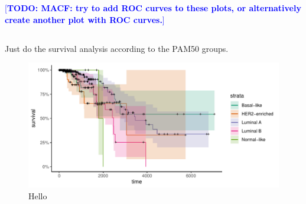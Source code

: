 \documentclass[10pt,twocolumn]{article}\usepackage[]{graphicx}\usepackage[]{color}
\makeatletter
\def\maxwidth{ %
  \ifdim\Gin@nat@width>\linewidth
    \linewidth
  \else
    \Gin@nat@width
  \fi
}
\newenvironment{knitrout}{}{} %
\newcommand{\todo}[1]{\textcolor{blue}{[\textbf{TODO: #1}]} }
\makeatother
\begin{document}
\todo{MACF: try to add ROC curves to these plots, or alternatively create another plot with ROC curves.}
\subsection{}
Just do the survival analysis according to the PAM50 groups.

\begin{knitrout}
\color{fgcolor}\begin{figure}[ht]

{\centering \includegraphics[width=\maxwidth]{figure/survival-1} 

}

\caption[Hello]{Hello}\label{fig:survival}
\end{figure}


\end{knitrout}

\subsection{} %
\end{document}
